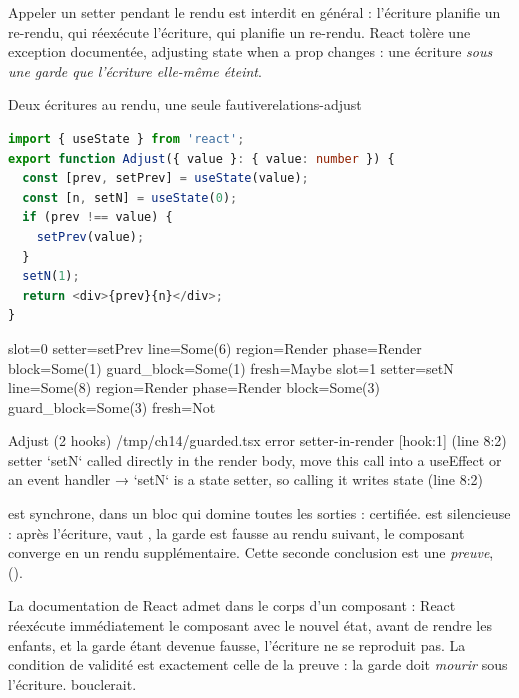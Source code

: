 Appeler un setter pendant le rendu est interdit en général : l'écriture planifie un re-rendu, qui réexécute l'écriture, qui planifie un re-rendu. React tolère une exception documentée, \og adjusting state when a prop changes\fg{} : une écriture \emph{sous une garde que l'écriture elle-même éteint}.

\begin{exemple}{Deux écritures au rendu, une seule fautive}{relations-adjust}
\begin{lstlisting}[language=TypeScript,caption={\file{/tmp/ch14/guarded.tsx}},label={lst:relations-adjust}]
import { useState } from 'react';
export function Adjust({ value }: { value: number }) {
  const [prev, setPrev] = useState(value);
  const [n, setN] = useState(0);
  if (prev !== value) {
    setPrev(value);
  }
  setN(1);
  return <div>{prev}{n}</div>;
}
\end{lstlisting}
\begin{sortie}
  slot=0 setter=setPrev line=Some(6) region=Render phase=Render block=Some(1) guard_block=Some(1) fresh=Maybe
  slot=1 setter=setN    line=Some(8) region=Render phase=Render block=Some(3) guard_block=Some(3) fresh=Not
\end{sortie}
\begin{sortie}
  Adjust  (2 hooks)  /tmp/ch14/guarded.tsx
    error  setter-in-render  [hook:1]  (line 8:2)  setter `setN` called directly in the render body, move this call into a useEffect or an event handler
       → `setN` is a state setter, so calling it writes state (line 8:2)
\end{sortie}
 est synchrone, dans un bloc qui domine toutes les sorties : \Error{} certifiée.  est silencieuse : après l'écriture,  vaut , la garde  est fausse au rendu suivant, le composant converge en un rendu supplémentaire. Cette seconde conclusion est une \emph{preuve},  ().
\end{exemple}

\begin{react}
La documentation de React admet  dans le corps d'un composant : React réexécute immédiatement le composant avec le nouvel état, avant de rendre les enfants, et la garde étant devenue fausse, l'écriture ne se reproduit pas. La condition de validité est exactement celle de la preuve : la garde doit \emph{mourir} sous l'écriture.  bouclerait.
\end{react}

